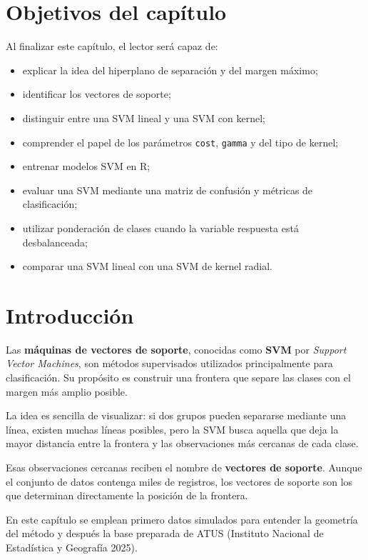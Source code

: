 \documentclass[
  spanish,
  10.5pt,
  letterpaper,
  openany,
  headings=big]{scrbook}
\providecommand{\tightlist}{%
  \setlength{\itemsep}{0pt}\setlength{\parskip}{0pt}}
\begin{document}
\section{Objetivos del capítulo}\label{objetivos-del-capuxedtulo-9}

Al finalizar este capítulo, el lector será capaz de:

\begin{itemize}
\tightlist
\item
  explicar la idea del hiperplano de separación y del margen máximo;
\item
  identificar los vectores de soporte;
\item
  distinguir entre una SVM lineal y una SVM con kernel;
\item
  comprender el papel de los parámetros \texttt{cost}, \texttt{gamma} y
  del tipo de kernel;
\item
  entrenar modelos SVM en R;
\item
  evaluar una SVM mediante una matriz de confusión y métricas de
  clasificación;
\item
  utilizar ponderación de clases cuando la variable respuesta está
  desbalanceada;
\item
  comparar una SVM lineal con una SVM de kernel radial.
\end{itemize}

\section{Introducción}\label{introducciuxf3n-5}

Las \textbf{máquinas de vectores de soporte}, conocidas como
\textbf{SVM} por \emph{Support Vector Machines}, son métodos
supervisados utilizados principalmente para clasificación. Su propósito
es construir una frontera que separe las clases con el margen más amplio
posible.

La idea es sencilla de visualizar: si dos grupos pueden separarse
mediante una línea, existen muchas líneas posibles, pero la SVM busca
aquella que deja la mayor distancia entre la frontera y las
observaciones más cercanas de cada clase.

Esas observaciones cercanas reciben el nombre de \textbf{vectores de
soporte}. Aunque el conjunto de datos contenga miles de registros, los
vectores de soporte son los que determinan directamente la posición de
la frontera.

En este capítulo se emplean primero datos simulados para entender la
geometría del método y después la base preparada de ATUS (Instituto
Nacional de Estadística y Geografía 2025).
\end{document}
